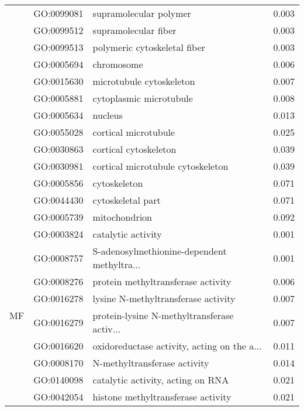 \begin{longtable}{lllr}
   & GO:0099081 &                       supramolecular polymer &         0.003 \\
   & GO:0099512 &                         supramolecular fiber &         0.003 \\
   & GO:0099513 &                 polymeric cytoskeletal fiber &         0.003 \\
   & GO:0005694 &                                   chromosome &         0.006 \\
   & GO:0015630 &                     microtubule cytoskeleton &         0.007 \\
   & GO:0005881 &                      cytoplasmic microtubule &         0.008 \\
   & GO:0005634 &                                      nucleus &         0.013 \\
   & GO:0055028 &                         cortical microtubule &         0.025 \\
   & GO:0030863 &                        cortical cytoskeleton &         0.039 \\
   & GO:0030981 &            cortical microtubule cytoskeleton &         0.039 \\
   & GO:0005856 &                                 cytoskeleton &         0.071 \\
   & GO:0044430 &                            cytoskeletal part &         0.071 \\
   & GO:0005739 &                                mitochondrion &         0.092 \\
\cline{1-4}
\multirow{17}{*}{MF} & GO:0003824 &                           catalytic activity &         0.001 \\
   & GO:0008757 &  S-adenosylmethionine-dependent methyltra... &         0.001 \\
   & GO:0008276 &           protein methyltransferase activity &         0.006 \\
   & GO:0016278 &          lysine N-methyltransferase activity &         0.007 \\
   & GO:0016279 &  protein-lysine N-methyltransferase activ... &         0.007 \\
   & GO:0016620 &  oxidoreductase activity, acting on the a... &         0.011 \\
   & GO:0008170 &                 N-methyltransferase activity &         0.014 \\
   & GO:0140098 &            catalytic activity, acting on RNA &         0.021 \\
   & GO:0042054 &           histone methyltransferase activity &         0.021 \\

\end{longtable}
